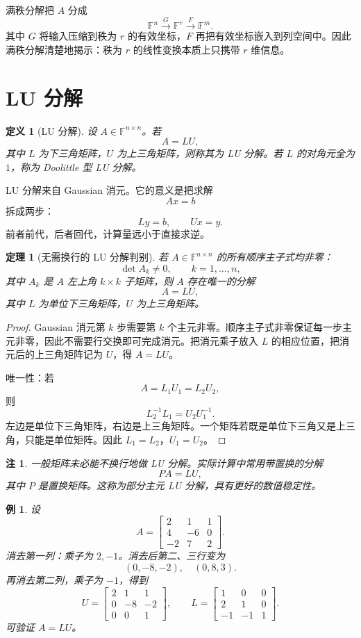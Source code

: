 \documentclass[UTF8,openany,zihao=-4]{ctexbook}
\theoremstyle{cnplain}
\newtheorem{definition}{定义}[chapter]
\newtheorem{theorem}{定理}[chapter]
\newtheorem{example}{例}[chapter]
\newtheorem{remark}{注}[chapter]
\newcommand{\F}{\mathbb F}
\begin{document}
满秩分解把 $A$ 分成
\[
\F^n \xrightarrow{G} \F^r \xrightarrow{F} \F^m.
\]
其中 $G$ 将输入压缩到秩为 $r$ 的有效坐标，$F$ 再把有效坐标嵌入到列空间中。因此满秩分解清楚地揭示：秩为 $r$ 的线性变换本质上只携带 $r$ 维信息。

\section{LU 分解}

\begin{definition}[LU 分解]
设 $A\in\F^{n\times n}$。若
\[
A=LU,
\]
其中 $L$ 为下三角矩阵，$U$ 为上三角矩阵，则称其为 LU 分解。若 $L$ 的对角元全为 $1$，称为 Doolittle 型 LU 分解。
\end{definition}

LU 分解来自 Gaussian 消元。它的意义是把求解
\[
Ax=b
\]
拆成两步：
\[
Ly=b,
\qquad
Ux=y.
\]
前者前代，后者回代，计算量远小于直接求逆。

\begin{theorem}[无需换行的 LU 分解判别]
若 $A\in\F^{n\times n}$ 的所有顺序主子式均非零：
\[
\det A_k\ne0,
\qquad k=1,
\ldots,n,
\]
其中 $A_k$ 是 $A$ 左上角 $k\times k$ 子矩阵，则 $A$ 存在唯一的分解
\[
A=LU,
\]
其中 $L$ 为单位下三角矩阵，$U$ 为上三角矩阵。
\end{theorem}

\begin{proof}
Gaussian 消元第 $k$ 步需要第 $k$ 个主元非零。顺序主子式非零保证每一步主元非零，因此不需要行交换即可完成消元。把消元乘子放入 $L$ 的相应位置，把消元后的上三角矩阵记为 $U$，得 $A=LU$。

唯一性：若
\[
A=L_1U_1=L_2U_2,
\]
则
\[
L_2^{-1}L_1=U_2U_1^{-1}.
\]
左边是单位下三角矩阵，右边是上三角矩阵。一个矩阵若既是单位下三角又是上三角，只能是单位矩阵。因此 $L_1=L_2$，$U_1=U_2$。
\end{proof}

\begin{remark}
一般矩阵未必能不换行地做 LU 分解。实际计算中常用带置换的分解
\[
PA=LU,
\]
其中 $P$ 是置换矩阵。这称为部分主元 LU 分解，具有更好的数值稳定性。
\end{remark}

\begin{example}
设
\[
A=\begin{bmatrix}
2&1&1\\
4&-6&0\\
-2&7&2
\end{bmatrix}.
\]
消去第一列：乘子为 $2,-1$。消去后第二、三行变为
\[
(0,-8,-2),
\quad
(0,8,3).
\]
再消去第二列，乘子为 $-1$，得到
\[
U=\begin{bmatrix}
2&1&1\\
0&-8&-2\\
0&0&1
\end{bmatrix},
\qquad
L=\begin{bmatrix}
1&0&0\\
2&1&0\\
-1&-1&1
\end{bmatrix}.
\]
可验证 $A=LU$。
\end{example}
\end{document}
